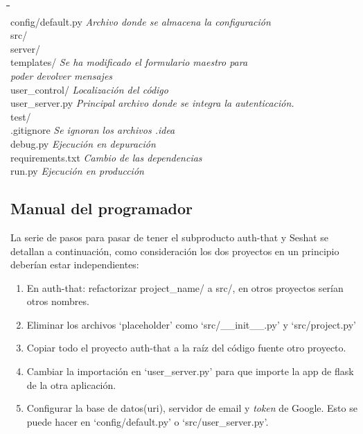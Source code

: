 \begin{tabbing}
\hphantom{tab }\= \hphantom{tab }\= \hphantom{tab }\= \hphantom{tab }\= \hphantom{quadruple tabula}\= \kill\\
config/default.py \> \> \> \> \> \textit{Archivo donde se almacena la configuración} \\
src/ \> \> \> \> \> \\
\> server/ \> \> \> \> \\
\> \> templates/ \> \> \> \textit{Se ha modificado el formulario maestro para} \\
\> \> \> \> \> \textit{poder devolver mensajes} \\
\> user\_control/ \> \> \> \> \textit{Localización del código} \\

\> user\_server.py \> \> \> \> \textit{Principal archivo donde se integra la autenticación.} \\
test/ \> \> \> \> \> \\
.gitignore \> \> \> \> \> \textit{Se ignoran los archivos .idea} \\
debug.py \> \> \> \> \> \textit{Ejecución en depuración} \\
requirements.txt \> \> \> \> \> \textit{Cambio de las dependencias} \\
run.py \> \> \> \> \> \textit{Ejecución en producción} \\
\end{tabbing}

\subsection{Manual del programador}

La serie de pasos para pasar de tener el subproducto auth-that y Seshat se detallan a continuación, como consideración los dos proyectos en un principio deberían estar independientes:

\begin{enumerate}
\setlength{\itemsep}{1pt}
\setlength{\parskip}{0pt}
\setlength{\parsep}{0pt}
\item En auth-that: refactorizar project\_name/ a  src/, en otros proyectos serían otros nombres.
\item Eliminar los archivos `placeholder' como `src/\_\_init\_\_.py' y `src/project.py'
\item Copiar todo el proyecto auth-that a la raíz del código fuente otro proyecto.
\item Cambiar la importación en `user\_server.py' para que importe la app de flask de la otra aplicación.
\item Configurar la base de datos(uri), servidor de email y \textit{token} de Google. Esto se puede hacer en `config/default.py' o `src/user\_server.py'.
\end{enumerate}


